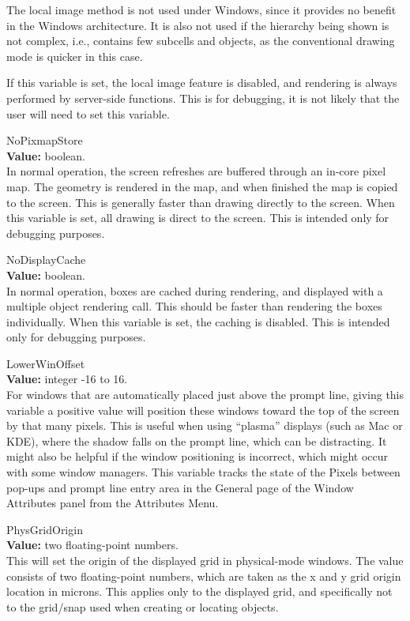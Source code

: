 \begin{description}
The local image method is not used under Windows, since it provides no
benefit in the Windows architecture.  It is also not used if the
hierarchy being shown is not complex, i.e., contains few subcells and
objects, as the conventional drawing mode is quicker in this case.

If this variable is set, the local image feature is disabled, and
rendering is always performed by server-side functions.  This is for
debugging, it is not likely that the user will need to set this
variable.

\item{\et NoPixmapStore}\\
{\bf Value:} boolean.\\
In normal operation, the screen refreshes are buffered through an
in-core pixel map.  The geometry is rendered in the map, and when
finished the map is copied to the screen.  This is generally faster
than drawing directly to the screen.  When this variable is set, all
drawing is direct to the screen.  This is intended only for debugging
purposes.

\item{\et NoDisplayCache}\\
{\bf Value:} boolean.\\
In normal operation, boxes are cached during rendering, and displayed
with a multiple object rendering call.  This should be faster than
rendering the boxes individually.  When this variable is set, the
caching is disabled.  This is intended only for debugging purposes.

\item{\et LowerWinOffset}\\
{\bf Value:} integer -16 to 16.\\
For windows that are automatically placed just above the prompt line,
giving this variable a positive value will position these windows
toward the top of the screen by that many pixels.  This is useful when
using ``plasma'' displays (such as Mac or KDE), where the shadow falls
on the prompt line, which can be distracting.  It might also be
helpful if the window positioning is incorrect, which might occur with
some window managers.  This variable tracks the state of the {\cb
Pixels between pop-ups and prompt line} entry area in the {\cb
General} page of the {\cb Window Attributes} panel from the {\cb
Attributes Menu}.

\item{\et PhysGridOrigin}\\
{\bf Value:} two floating-point numbers.\\
This will set the origin of the displayed grid in physical-mode
windows.  The value consists of two floating-point numbers, which are
taken as the x and y grid origin location in microns.  This applies
only to the displayed grid, and specifically not to the grid/snap used
when creating or locating objects.


\end{description}
